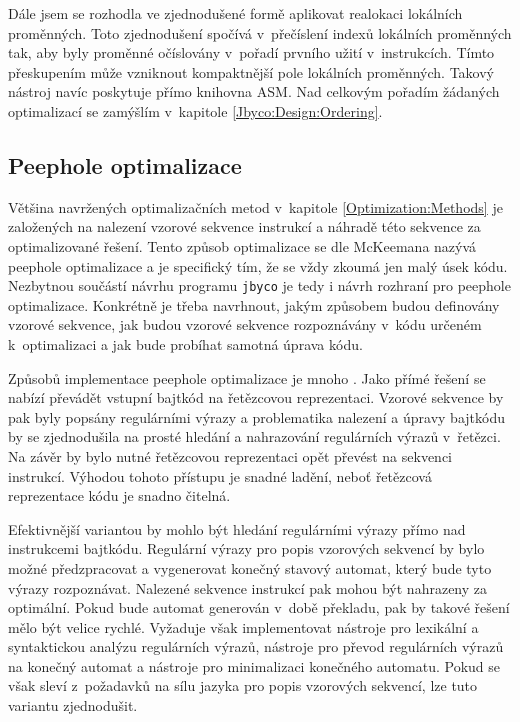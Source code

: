 Dále jsem se rozhodla ve zjednodušené formě aplikovat realokaci lokálních proměnných. Toto zjednodušení spočívá v~přečíslení indexů lokálních proměnných tak, aby byly proměnné očíslovány v~pořadí prvního užití v~instrukcích. Tímto přeskupením může vzniknout kompaktnější pole lokálních proměnných. Takový nástroj navíc poskytuje přímo knihovna ASM. Nad celkovým pořadím žádaných optimalizací se zamýšlím v~kapitole \ref{Jbyco:Design:Ordering}.

\subsection{Peephole optimalizace}\label{Jbyco:Design:Peephole}

Většina navržených optimalizačních metod v~kapitole \ref{Optimization:Methods} je založených na nalezení vzorové sekvence instrukcí a náhradě této sekvence za optimalizované řešení. Tento způsob optimalizace se dle McKeemana \cite{McKeeman:Peephole} nazývá peephole optimalizace a je specifický tím, že se vždy zkoumá jen malý úsek kódu. Nezbytnou součástí návrhu programu \texttt{jbyco} je tedy i návrh rozhraní pro peephole optimalizace. Konkrétně je třeba navrhnout, jakým způsobem budou definovány vzorové sekvence, jak budou vzorové sekvence rozpoznávány v~kódu určeném k~optimalizaci a jak bude probíhat samotná úprava kódu.

Způsobů implementace peephole optimalizace je mnoho \cite{Chakraborty:Peephole}. Jako přímé řešení se nabízí převádět vstupní bajtkód na řetězcovou reprezentaci. Vzorové sekvence by pak byly popsány regulárními výrazy a problematika nalezení a úpravy bajtkódu by se zjednodušila na prosté hledání a nahrazování regulárních výrazů v~řetězci. Na závěr by bylo nutné řetězcovou reprezentaci opět převést na sekvenci instrukcí. Výhodou tohoto přístupu je snadné ladění, neboť řetězcová reprezentace kódu je snadno čitelná.

Efektivnější variantou by mohlo být hledání regulárními výrazy přímo nad instrukcemi bajtkódu. Regulární výrazy pro popis vzorových sekvencí by bylo možné předzpracovat a vygenerovat konečný stavový automat, který bude tyto výrazy rozpoznávat. Nalezené sekvence instrukcí pak mohou být nahrazeny za optimální. Pokud bude automat generován v~době překladu, pak by takové řešení mělo být velice rychlé. Vyžaduje však implementovat nástroje pro lexikální a syntaktickou analýzu regulárních výrazů, nástroje pro převod regulárních výrazů na konečný automat a nástroje pro minimalizaci konečného automatu. Pokud se však sleví z~požadavků na sílu jazyka pro popis vzorových sekvencí, lze tuto variantu zjednodušit.

